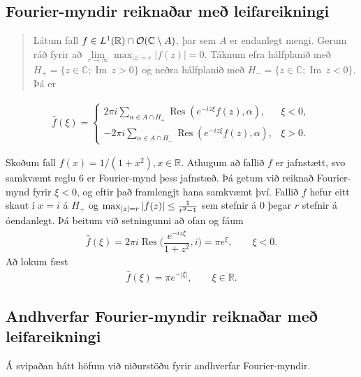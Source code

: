 \documentclass[a4paper,10pt,icelandic]{sphinxmanual}
\begin{document}
\subsection{Fourier-myndir reiknaðar með leifareikningi}
\label{\detokenize{Kafli04:fourier-myndir-reiknaar-me-leifareikningi}}
\begin{quote}

Látum fall \(f\in L^1({{\mathbb R}})\cap {{\cal O}}({{\mathbb C}}\setminus A)\), þar sem \(A\) er endanlegt mengi.
Gerum ráð fyrir að \(\lim\limits_{r\to \infty}\max_{|z|=r}|f(z)|=0\).
Táknum efra hálfplanið með \(H_+=\{z\in {{\mathbb C}}; {{\operatorname{Im\, }}}z>0\}\) og neðra hálfplanið með \(H_-=\{z\in {{\mathbb C}}; {{\operatorname{Im\, }}}z<0\}\).
Þá er
\end{quote}
\begin{equation*}
\begin{split}\widehat f(\xi) =
\begin{cases}  2\pi i\sum_{\alpha\in A\cap H_+}
{{\operatorname{Res}}}(e^{-iz\xi}f(z),\alpha), & \xi < 0,\\
-2\pi i\sum_{\alpha\in A\cap H_-}
{{\operatorname{Res}}}(e^{-iz\xi}f(z),\alpha),  & \xi > 0.
\end{cases}\end{split}
\end{equation*}

Skoðum fall \(f(x)=1/(1+x^2), x\in {{\mathbb R}}.\) Athugum að fallið \(f\) er jafnstætt, svo samkvæmt reglu 6 er Fourier-mynd þess jafnstæð. Þá getum við reiknað Fourier-mynd fyrir \(\xi<0\), og eftir það framlengjt hana samkvæmt því. Fallið \(f\) hefur eitt skaut í \(x=i\) á \(H_+\) og \(\max_{|z|=r}|f(z)| \le {1\over r^2-1}\) sem stefnir á 0 þegar \(r\) stefnir á óendanlegt. Þá beitum við setningunni að ofan og fáum
\begin{equation*}
\begin{split}\widehat f(\xi) = 2\pi i
{{\operatorname{Res}}}\bigg(\dfrac{e^{-iz\xi}}{1+z^2},i\bigg)
=\pi e^{\xi}, \qquad \xi<0.\end{split}
\end{equation*}
Að lokum fæst
\begin{equation*}
\begin{split}\widehat f(\xi) =\pi e^{-|\xi|}, \qquad \xi\in {{\mathbb  R}}.\end{split}
\end{equation*}

\subsection{Andhverfar Fourier-myndir reiknaðar með leifareikningi}
\label{\detokenize{Kafli04:andhverfar-fourier-myndir-reiknaar-me-leifareikningi}}
Á svipaðan hátt höfum við niðurstöðu fyrir andhverfar  Fourier-myndir.
\end{document}
